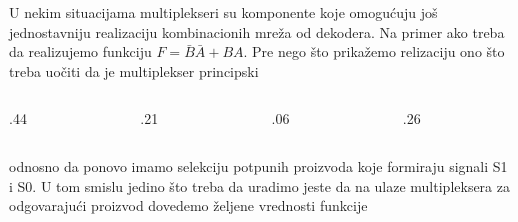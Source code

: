 \begin{frame}[label=03-s014]
\fontsize{9}{10}\selectfont
\setlength{\parskip}{2pt}
U nekim situacijama multiplekseri su komponente koje omogućuju još jednostavniju realizaciju kombinacionih mreža od dekodera. Na primer ako treba da realizujemo funkciju \(F=\bar B\bar A+BA\). Pre nego što prikažemo relizaciju ono što treba uočiti da je multiplekser principski
\begingroup
\def\DEoznsize{8}\def\DEoblik{.6}\def\DEdekmod{1}\def\DEcs{0}\def\DEprimer{0}\def\DEjedinica{.75cm}
\begin{columns}[c,onlytextwidth]
\begin{column}{.44\textwidth}\centering

\end{column}
\begin{column}{.21\textwidth}\centering

\end{column}
\begin{column}{.06\textwidth}\centering
{}
\end{column}
\begin{column}{.26\textwidth}\centering
\def\DEprimer{1}

\end{column}
\end{columns}
\endgroup
odnosno da ponovo imamo selekciju potpunih proizvoda koje formiraju signali S1 i S0. U tom smislu jedino što treba da uradimo jeste da na ulaze multipleksera za odgovarajući proizvod dovedemo željene vrednosti funkcije
\end{frame}
